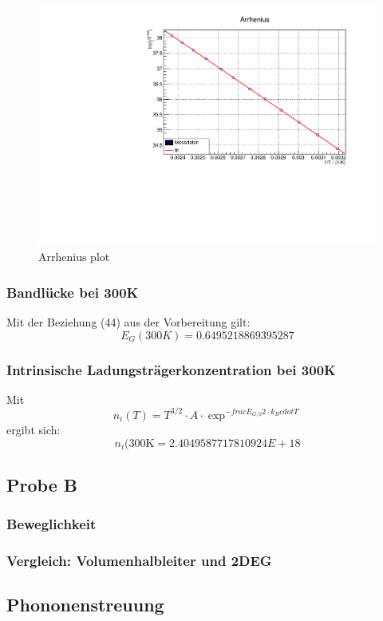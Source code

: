 \begin{figure}
\label{fig:leitin}
\centering
\includegraphics[scale = 0.5]{../data/A5.pdf}
\caption{Arrhenius plot}
\end{figure}


\subsubsection{Bandlücke bei 300K}
\FloatBarrier
Mit der Beziehung (44) aus der Vorbereitung gilt:
$$E_G(300K) = 0.6495218869395287 $$

\subsubsection{Intrinsische Ladungsträgerkonzentration bei 300K}
\FloatBarrier
Mit 
$$ n_i (T) = T^{3/2} \cdot A \cdot \exp^{- frac{E_{G,0}}{2 \cdot k_B }cdot T}$$
ergibt sich:
$$n_i(300 \text{K} = 2.4049587717810924E+18 $$

\subsection{Probe B}
\subsubsection{Beweglichkeit}
\FloatBarrier

\subsubsection{Vergleich: Volumenhalbleiter und 2DEG}
\FloatBarrier

\subsection{Phononenstreuung}
\FloatBarrier


